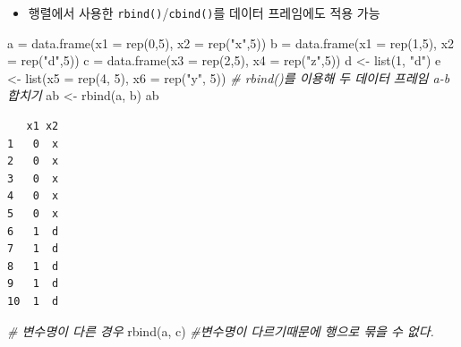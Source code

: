 \documentclass[
  11pt,
]{krantz}
\newenvironment{Shaded}{\begin{snugshade}}{\end{snugshade}}
\newcommand{\AttributeTok}[1]{\textcolor[rgb]{0.61,0.61,0.61}{#1}}
\newcommand{\CommentTok}[1]{\textcolor[rgb]{0.37,0.37,0.37}{\textit{#1}}}
\newcommand{\DecValTok}[1]{\textcolor[rgb]{0.06,0.06,0.06}{#1}}
\newcommand{\FunctionTok}[1]{\textcolor[rgb]{0,0,0}{#1}}
\newcommand{\NormalTok}[1]{#1}
\newcommand{\OtherTok}[1]{\textcolor[rgb]{0.37,0.37,0.37}{#1}}
\newcommand{\StringTok}[1]{\textcolor[rgb]{0.5,0.5,0.5}{#1}}
\providecommand{\tightlist}{%
  \setlength{\itemsep}{0pt}\setlength{\parskip}{0pt}}
\begin{document}
\begin{itemize}
\tightlist
\item
  행렬에서 사용한 \texttt{rbind()}/\texttt{cbind()}를 데이터 프레임에도 적용 가능
\end{itemize}

\footnotesize

\begin{Shaded}
\begin{Highlighting}[]
\NormalTok{a }\OtherTok{=} \FunctionTok{data.frame}\NormalTok{(}\AttributeTok{x1 =} \FunctionTok{rep}\NormalTok{(}\DecValTok{0}\NormalTok{,}\DecValTok{5}\NormalTok{), }\AttributeTok{x2 =} \FunctionTok{rep}\NormalTok{(}\StringTok{"x"}\NormalTok{,}\DecValTok{5}\NormalTok{))}
\NormalTok{b }\OtherTok{=} \FunctionTok{data.frame}\NormalTok{(}\AttributeTok{x1 =} \FunctionTok{rep}\NormalTok{(}\DecValTok{1}\NormalTok{,}\DecValTok{5}\NormalTok{), }\AttributeTok{x2 =} \FunctionTok{rep}\NormalTok{(}\StringTok{"d"}\NormalTok{,}\DecValTok{5}\NormalTok{))}
\NormalTok{c }\OtherTok{=} \FunctionTok{data.frame}\NormalTok{(}\AttributeTok{x3 =} \FunctionTok{rep}\NormalTok{(}\DecValTok{2}\NormalTok{,}\DecValTok{5}\NormalTok{), }\AttributeTok{x4 =} \FunctionTok{rep}\NormalTok{(}\StringTok{"z"}\NormalTok{,}\DecValTok{5}\NormalTok{))}
\NormalTok{d }\OtherTok{\textless{}{-}} \FunctionTok{list}\NormalTok{(}\DecValTok{1}\NormalTok{, }\StringTok{"d"}\NormalTok{)}
\NormalTok{e }\OtherTok{\textless{}{-}} \FunctionTok{list}\NormalTok{(}\AttributeTok{x5 =} \FunctionTok{rep}\NormalTok{(}\DecValTok{4}\NormalTok{, }\DecValTok{5}\NormalTok{), }\AttributeTok{x6 =} \FunctionTok{rep}\NormalTok{(}\StringTok{"y"}\NormalTok{, }\DecValTok{5}\NormalTok{))}
\CommentTok{\# rbind()를 이용해 두 데이터 프레임 a{-}b 합치기}
\NormalTok{ab }\OtherTok{\textless{}{-}} \FunctionTok{rbind}\NormalTok{(a, b)}
\NormalTok{ab}
\end{Highlighting}
\end{Shaded}

\begin{verbatim}
   x1 x2
1   0  x
2   0  x
3   0  x
4   0  x
5   0  x
6   1  d
7   1  d
8   1  d
9   1  d
10  1  d
\end{verbatim}

\begin{Shaded}
\begin{Highlighting}[]
\CommentTok{\# 변수명이 다른 경우}
\FunctionTok{rbind}\NormalTok{(a, c) }\CommentTok{\#변수명이 다르기때문에 행으로 묶을 수 없다.}
\end{Highlighting}
\end{Shaded}
\end{document}
